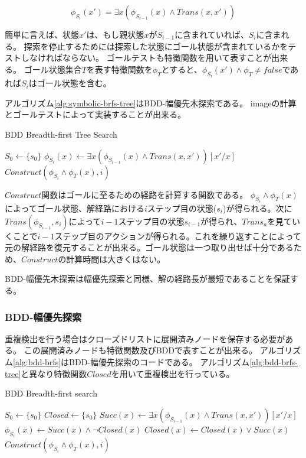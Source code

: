 \documentclass[10pt]{book}
\begin{document}
\begin{equation}
	\phi_{S_i}(x') = \exists x (\phi_{S_{i-1}}(x) \land Trans(x,x'))
\end{equation}

簡単に言えば、状態$x'$は、もし親状態$x$が$S_{i-1}$に含まれていれば、$S_i$に含まれる。
探索を停止するためには探索した状態にゴール状態が含まれているかをテストしなければならない。
ゴールテストも特徴関数を用いて表すことが出来る。
ゴール状態集合$T$を表す特徴関数を$\phi_T$とすると、$\phi_{S_i}(x') \land \phi_T \neq false$であれば$S_i$はゴール状態を含む。

アルゴリズム\ref{alg:symbolic-brfs-tree}はBDD-幅優先木探索である。
imageの計算とゴールテストによって実装することが出来る。


\begin{algorithm}
\caption{BDD Breadth-first Tree Search}
\label{alg:bdd-brfs-tree}
	$S_0 \leftarrow \{s_0\}$\;
	 {
		$\phi_{S_i}(x) \leftarrow \exists x (\phi_{S_{i-1}}(x) \land Trans(x,x'))[x'/x]$\;
		 {
			\Return $Construct(\phi_{S_i} \land \phi_T(x), i)$\;
		}
	}
\end{algorithm}


$Construct$関数はゴールに至るための経路を計算する関数である。
$\phi_{S_i} \land \phi_T(x)$によってゴール状態、解経路における$i$ステップ目の状態($s_i$)が得られる。次に$Trans(\phi_{S_{i-1}}, s_i)$によって$i-1$ステップ目の状態$s_{i-1}$が得られ、$Trans_a$を見ていくことで$i-1$ステップ目のアクションが得られる。これを繰り返すことによって元の解経路を復元することが出来る。ゴール状態は一つ取り出せば十分であるため、$Construct$の計算時間は大きくはない。

BDD-幅優先木探索は幅優先探索と同様、解の経路長が最短であることを保証する。


\subsubsection{BDD-幅優先探索}

重複検出を行う場合はクローズドリストに展開済みノードを保存する必要がある。
この展開済みノードも特徴関数及びBDDで表すことが出来る。
アルゴリズム\ref{alg:bdd-brfs}はBDD-幅優先探索のコードである。
アルゴリズム\ref{alg:bdd-brfs-tree}と異なり特徴関数$Closed$を用いて重複検出を行っている。

\begin{algorithm}
\caption{BDD Breadth-first search}
\label{alg:bdd-brfs}
	$S_0 \leftarrow \{s_0\}$\;
	$Closed \leftarrow \{s_0\}$\;
	 {
		$Succ(x) \leftarrow \exists x (\phi_{S_{i-1}}(x) \land Trans(x,x'))[x'/x]$\;
		$\phi_{S_i}(x) \leftarrow Succ(x) \land \lnot Closed(x)$\;
		$Closed(x) \leftarrow Closed(x) \lor Succ(x)$\;
		 {
			\Return $Construct(\phi_{S_i} \land \phi_T(x), i)$\;
		}
	}
\end{algorithm}
\end{document}
